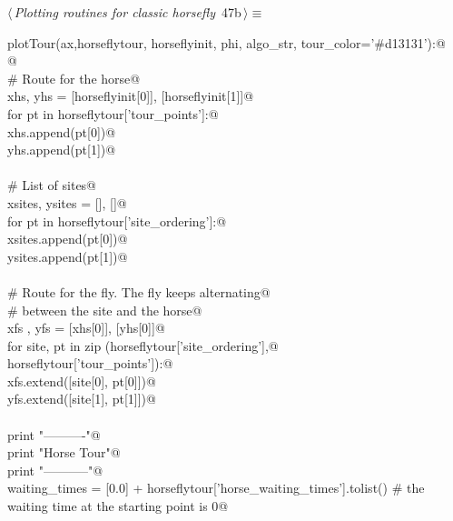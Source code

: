 \documentclass[11.5pt]{report}
\begin{document}
\begin{flushleft} \small\label{scrap69}\raggedright\small
{} $\langle\,${\itshape Plotting routines for classic horsefly}\nobreak\ {\footnotesize {47b}}$\,\rangle\equiv$
\vspace{-1ex}
\begin{list}{}{} \item
\mbox{}\verb@def plotTour(ax,horseflytour, horseflyinit, phi, algo_str, tour_color='#d13131'):@\\
\mbox{}\verb@   @\\
\mbox{}\verb@    # Route for the horse@\\
\mbox{}\verb@    xhs, yhs = [horseflyinit[0]], [horseflyinit[1]]@\\
\mbox{}\verb@    for pt in horseflytour['tour_points']:@\\
\mbox{}\verb@        xhs.append(pt[0])@\\
\mbox{}\verb@        yhs.append(pt[1])@\\
\mbox{}\verb@@\\
\mbox{}\verb@    # List of sites@\\
\mbox{}\verb@    xsites, ysites = [], []@\\
\mbox{}\verb@    for pt in horseflytour['site_ordering']:@\\
\mbox{}\verb@        xsites.append(pt[0])@\\
\mbox{}\verb@        ysites.append(pt[1])@\\
\mbox{}\verb@@\\
\mbox{}\verb@    # Route for the fly. The fly keeps alternating@\\
\mbox{}\verb@    # between the site and the horse@\\
\mbox{}\verb@    xfs , yfs = [xhs[0]], [yhs[0]]@\\
\mbox{}\verb@    for site, pt in zip (horseflytour['site_ordering'],@\\
\mbox{}\verb@                         horseflytour['tour_points']):@\\
\mbox{}\verb@        xfs.extend([site[0], pt[0]])@\\
\mbox{}\verb@        yfs.extend([site[1], pt[1]])@\\
\mbox{}\verb@@\\
\mbox{}\verb@    print "\n----------"@\\
\mbox{}\verb@    print "Horse Tour"@\\
\mbox{}\verb@    print "-----------"@\\
\mbox{}\verb@    waiting_times = [0.0] + horseflytour['horse_waiting_times'].tolist() # the waiting time at the starting point is 0@\\

\end{list}
\end{flushleft}
\end{document}
